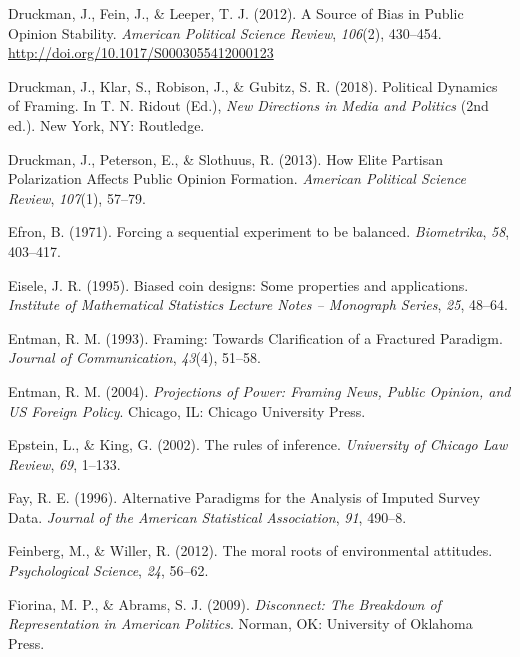 \documentclass[12pt,econ]{sources/authesis}
\begin{document}
\leavevmode\hypertarget{ref-druckman_source_2012}{}%
Druckman, J., Fein, J., \& Leeper, T. J. (2012). A Source of Bias in Public Opinion Stability. \emph{American Political Science Review}, \emph{106}(2), 430--454. \url{http://doi.org/10.1017/S0003055412000123}

\leavevmode\hypertarget{ref-druckman_political_2018}{}%
Druckman, J., Klar, S., Robison, J., \& Gubitz, S. R. (2018). Political Dynamics of Framing. In T. N. Ridout (Ed.), \emph{New Directions in Media and Politics} (2nd ed.). New York, NY: Routledge.

\leavevmode\hypertarget{ref-druckman_how_2013}{}%
Druckman, J., Peterson, E., \& Slothuus, R. (2013). How Elite Partisan Polarization Affects Public Opinion Formation. \emph{American Political Science Review}, \emph{107}(1), 57--79.

\leavevmode\hypertarget{ref-efron_1971_forcing}{}%
Efron, B. (1971). Forcing a sequential experiment to be balanced. \emph{Biometrika}, \emph{58}, 403--417.

\leavevmode\hypertarget{ref-eisele_1995_biased}{}%
Eisele, J. R. (1995). Biased coin designs: Some properties and applications. \emph{Institute of Mathematical Statistics Lecture Notes -- Monograph Series}, \emph{25}, 48--64.

\leavevmode\hypertarget{ref-entman_framing_1993}{}%
Entman, R. M. (1993). Framing: Towards Clarification of a Fractured Paradigm. \emph{Journal of Communication}, \emph{43}(4), 51--58.

\leavevmode\hypertarget{ref-entman_projections_2004}{}%
Entman, R. M. (2004). \emph{Projections of Power: Framing News, Public Opinion, and US Foreign Policy}. Chicago, IL: Chicago University Press.

\leavevmode\hypertarget{ref-epstein_2002_rules}{}%
Epstein, L., \& King, G. (2002). The rules of inference. \emph{University of Chicago Law Review}, \emph{69}, 1--133.

\leavevmode\hypertarget{ref-fay_1996_alternative}{}%
Fay, R. E. (1996). Alternative Paradigms for the Analysis of Imputed Survey Data. \emph{Journal of the American Statistical Association}, \emph{91}, 490--8.

\leavevmode\hypertarget{ref-feinberg_2012_moral}{}%
Feinberg, M., \& Willer, R. (2012). The moral roots of environmental attitudes. \emph{Psychological Science}, \emph{24}, 56--62.

\leavevmode\hypertarget{ref-fiorina_disconnect_2009}{}%
Fiorina, M. P., \& Abrams, S. J. (2009). \emph{Disconnect: The Breakdown of Representation in American Politics}. Norman, OK: University of Oklahoma Press.
\end{document}
